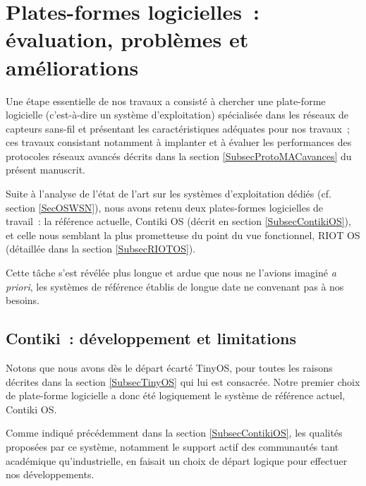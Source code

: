 
\chapter{Plates-formes logicielles~: évaluation, problèmes et améliorations}
\label{ChPFLogicielles}

Une étape essentielle de nos travaux a consisté à chercher une plate-forme
logicielle (c'est-à-dire un système d'exploitation) spécialisée dans les
réseaux de capteurs sans-fil et présentant les caractéristiques adéquates
pour nos travaux~; ces travaux consistant notamment à implanter et à
évaluer les performances des protocoles réseaux avancés décrits dans
la section \vref{SubsecProtoMACavances} du présent manuscrit.

Suite à l'analyse de l'état de l'art sur les systèmes d'exploitation dédiés
(cf. section \vref{SecOSWSN}), nous avons retenu deux plates-formes
logicielles de travail~: la référence actuelle, Contiki OS (décrit
en section \vref{SubsecContikiOS}), et celle nous semblant la plus
prometteuse du point du vue fonctionnel, RIOT OS (détaillée dans
la section \vref{SubsecRIOTOS}).

\medskip

Cette tâche s'est révélée plus longue et ardue que nous ne l'avions
imaginé \textit{a priori}, les systèmes de référence établis de longue
date ne convenant pas à nos besoins.


\section{Contiki~: développement et limitations}
\label{SecLimContiki}

Notons que nous avons dès le départ écarté TinyOS, pour toutes les raisons
décrites dans la section \vref{SubsecTinyOS} qui lui est consacrée.
Notre premier choix de plate-forme logicielle a donc été logiquement
le système de référence actuel, Contiki OS.

Comme indiqué précédemment dans la section \vref{SubsecContikiOS}, les
qualités proposées par ce système, notamment le support actif des communautés
tant académique qu'industrielle, en faisait un choix de départ logique pour
effectuer nos développements.

